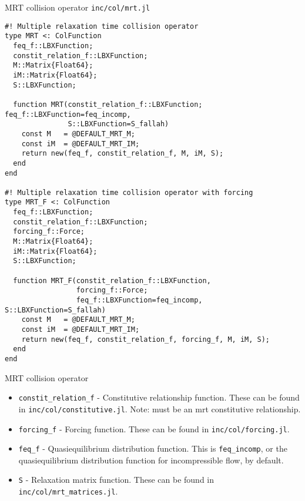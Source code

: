 \documentclass[pdf]{beamer}
\begin{document}
\begin{frame}[fragile]{MRT collision operator}
  \texttt{inc/col/mrt.jl}
  \tiny
  \begin{lstlisting}
#! Multiple relaxation time collision operator 
type MRT <: ColFunction
  feq_f::LBXFunction;
  constit_relation_f::LBXFunction;
  M::Matrix{Float64};
  iM::Matrix{Float64};
  S::LBXFunction;

  function MRT(constit_relation_f::LBXFunction; feq_f::LBXFunction=feq_incomp,
               S::LBXFunction=S_fallah)
    const M   = @DEFAULT_MRT_M;
    const iM  = @DEFAULT_MRT_IM;
    return new(feq_f, constit_relation_f, M, iM, S);
  end
end

#! Multiple relaxation time collision operator with forcing 
type MRT_F <: ColFunction
  feq_f::LBXFunction;
  constit_relation_f::LBXFunction;
  forcing_f::Force;
  M::Matrix{Float64};
  iM::Matrix{Float64};
  S::LBXFunction;

  function MRT_F(constit_relation_f::LBXFunction,
                 forcing_f::Force; 
                 feq_f::LBXFunction=feq_incomp, S::LBXFunction=S_fallah)
    const M   = @DEFAULT_MRT_M;
    const iM  = @DEFAULT_MRT_IM;
    return new(feq_f, constit_relation_f, forcing_f, M, iM, S);
  end
end
  \end{lstlisting}
\end{frame}

\begin{frame}{MRT collision operator}
  \begin{itemize}
    \item \texttt{constit\_relation\_f} - Constitutive relationship function. These can be found in \texttt{inc/col/constitutive.jl}. Note: must be an mrt constitutive relationship.
    \item \texttt{forcing\_f} - Forcing function. These can be found in \texttt{inc/col/forcing.jl}.
    \item \texttt{feq\_f} - Quasiequilibrium distribution function. This is \texttt{feq\_incomp}, or the quasiequilibrium distribution function for incompressible flow, by default.
    \item \texttt{S} - Relaxation matrix function. These can be found in \texttt{inc/col/mrt\_matrices.jl}.
  \end{itemize}
\end{frame}
\end{document}
